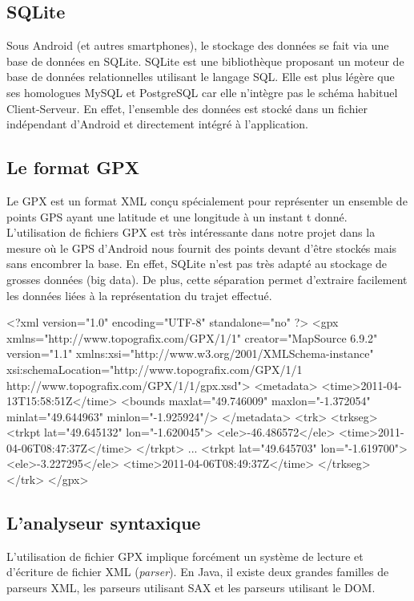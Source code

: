 \subsection{SQLite}
Sous Android (et autres smartphones), le stockage des données se fait via une base de données en SQLite. SQLite est une bibliothèque proposant un moteur de base de données relationnelles utilisant le langage SQL. Elle est plus légère que ses homologues MySQL et PostgreSQL car elle n'intègre pas le schéma habituel Client-Serveur. En effet, l'ensemble des données est stocké dans un fichier indépendant d'Android et directement intégré à l'application.

\subsection{Le format GPX}
Le GPX est un format XML conçu spécialement pour représenter un ensemble de points GPS ayant une latitude et une longitude à un instant t donné. L'utilisation de fichiers GPX est très intéressante dans notre projet dans la mesure où le GPS d'Android nous fournit des points devant d'être stockés mais sans encombrer la base. En effet, SQLite n'est pas très adapté au stockage de grosses données (big data). De plus, cette séparation permet d'extraire facilement les données liées à la représentation du trajet effectué.

\begin{xml}
<?xml version="1.0" encoding="UTF-8" standalone="no" ?>
<gpx xmlns="http://www.topografix.com/GPX/1/1" creator="MapSource 6.9.2" version="1.1" xmlns:xsi="http://www.w3.org/2001/XMLSchema-instance" xsi:schemaLocation="http://www.topografix.com/GPX/1/1 http://www.topografix.com/GPX/1/1/gpx.xsd">
  <metadata>
    <time>2011-04-13T15:58:51Z</time>
    <bounds maxlat="49.746009" maxlon="-1.372054" minlat="49.644963" minlon="-1.925924"/>
  </metadata>
  <trk>
    <trkseg>
      <trkpt lat="49.645132" lon="-1.620045">
        <ele>-46.486572</ele>
        <time>2011-04-06T08:47:37Z</time>
      </trkpt>
     ...
      <trkpt lat="49.645703" lon="-1.619700">
        <ele>-3.227295</ele>
        <time>2011-04-06T08:49:37Z</time>
    </trkseg>
  </trk>
</gpx>
\end{xml}

\subsection{L'analyseur syntaxique}
L'utilisation de fichier GPX implique forcément un système de lecture et d'écriture de fichier XML (\textit{parser}). En Java, il existe deux grandes familles de parseurs XML, les parseurs utilisant SAX et les parseurs utilisant le DOM.

